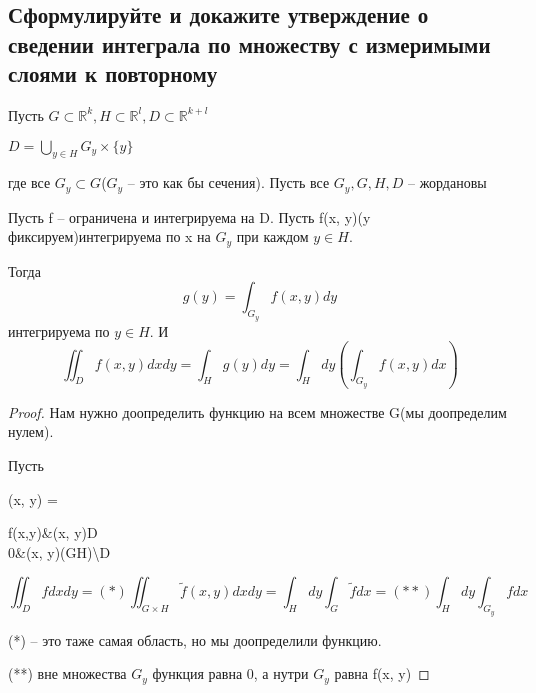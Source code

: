 
\subsection{Сформулируйте и докажите утверждение о сведении интеграла по множеству с измеримыми слоями к повторному}
Пусть $G \subset \mathbb{R}^k, H \subset\mathbb{R}^l, D\subset \mathbb{R}^{k + l}$


$D = \bigcup_{y\in H}G_y\times \{y\}$

где все $G_y\subset G$($G_y$ -- это как бы сечения). Пусть все $G_y, G, H, D$ -- жордановы

\begin{theorem}
	Пусть f -- ограничена и интегрируема на D. Пусть f(x, y)(y фиксируем)интегрируема по x на $G_y$ при каждом $y \in H$.
	
	Тогда 
	\[g(y) = \int_{G_y}f(x, y)dy\]
	интегрируема по $y \in H$. И
	\[\iint_D f(x, y)dxdy = \int_H g(y)dy = \int_{H}dy\left(\int_{G_y}f(x, y)dx\right)\]
\end{theorem}
\begin{proof}
	Нам нужно доопределить функцию на всем множестве G(мы доопределим нулем).
	
	
	Пусть 
	\begin{flalign}
	(x, y) = 
	\begin{cases}
	f(x,y)&(x, y)\in D\\
	0&(x, y)\in (G\times H)\backslash D
	\end{cases}
	\end{flalign}
	\[\iint_Dfdxdy =(*) \iint_{G\times H}\widetilde{f}(x, y) dxdy = \int_{H}dy\int_{G}\widetilde{f}dx = (**)\int_{H}dy\int_{G_y}fdx\]
	
	(*) -- это таже самая область, но мы доопределили функцию.
	
	
	(**) вне множества $G_y$ функция равна 0, а нутри $G_y$ равна f(x, y)
\end{proof}

